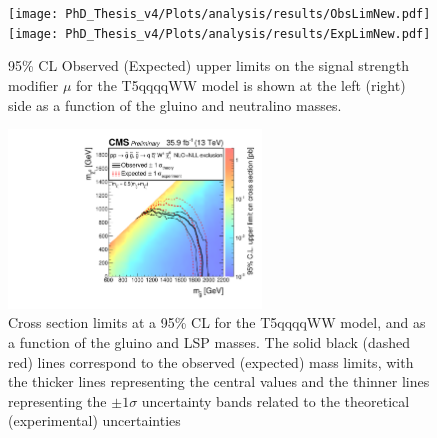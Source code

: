 \begin{figure}[!h]
\centering
  \texttt{[image: PhD\_Thesis\_v4/Plots/analysis/results/ObsLimNew.pdf]}
 \texttt{[image: PhD\_Thesis\_v4/Plots/analysis/results/ExpLimNew.pdf]}
  \caption{ 95\% CL Observed (Expected) upper limits on the signal strength modifier $\mu$ for the T5qqqqWW model is shown at the left (right) side as a function of the gluino and neutralino masses.
  }
  \label{fig:uplims}
\end{figure}

\begin{figure}[!h]
\centering
  \includegraphics[width=0.6\textwidth]{Plots/analysis/results/CMS-PAS-SUS-16-042_Figure_004-b.pdf}
  \caption{ Cross section limits at a 95\% CL for the T5qqqqWW model, and as a function of the gluino and LSP masses. The solid black (dashed red) lines correspond to the observed (expected) mass limits, with the
  thicker lines representing the central values and the thinner lines
representing the $\pm 1\sigma$ uncertainty bands related to the theoretical
(experimental) uncertainties
  }
  \label{fig:FinalLim}
\end{figure}

